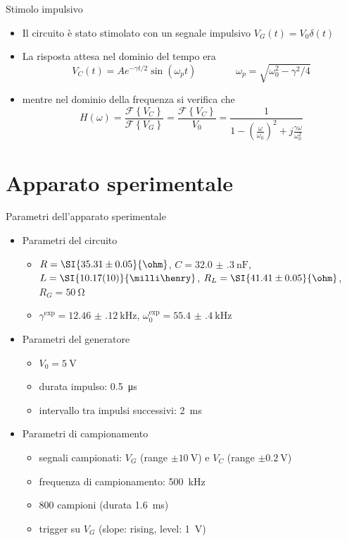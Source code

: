 \documentclass[11pt, xcolor=dvipsnames, aspectratio=43]{beamer}
\newcommand{\fourier}[1]{\mathcal{F}\left\{#1\right\}}
\begin{document}
\begin{frame}{Stimolo impulsivo}
\begin{itemize}
\item<1->{
Il circuito è stato stimolato con un segnale impulsivo $V_G(t) = V_0 \delta(t)$
}

\item<2->{
La risposta attesa nel dominio del \alert{tempo} era
\[
V_C(t) = Ae^{- \gamma t / 2}\sin{(\omega_p t)} \qquad \qquad \omega_p = \sqrt{\omega_0^2 - \gamma^2 / 4}
\]
}
\item<3->{
mentre nel dominio della \alert{frequenza} si verifica che
\[
H(\omega) = \frac{\fourier{V_C}}{\fourier{V_G}} = \frac{\fourier{V_C}}{V_0} =  \frac{1}{1 - \left(\frac{\omega}{\omega_0}\right)^2 + j \frac{\gamma \omega}{\omega_0^2}}
\]
}

\end{itemize}
\end{frame}

\section{Apparato sperimentale}
\begin{frame}{Parametri dell'apparato sperimentale}
\begin{itemize}
\item<1-> Parametri del circuito
\begin{itemize}
\item<1-> {$R = \SI{35.31 \pm 0.05}{\ohm}$, $C=\SI{32.0(3)}{\nano\farad}$, $L= \SI{10.17 (10)}{\milli\henry}$, $R_L = \SI{41.41 \pm 0.05}{\ohm}$, $R_G = \SI{50}{\ohm}$}
\item<1-> $\gamma^\text{exp} = \SI{12.46(12)}{\kilo\hertz}$, $\omega_0^\text{exp} = \SI{55.4(4)}{\kilo\hertz}$
\end{itemize}

\item<2-> Parametri del generatore
\begin{itemize}
\item<2-> $V_0 = \SI{5}{\volt}$
\item<2-> durata impulso: \SI{0.5}{\micro\second}
\item<2-> intervallo tra impulsi successivi: \SI{2}{\milli\second} 
\end{itemize}

\item<3-> Parametri di campionamento
\begin{itemize}
\item<3-> segnali campionati: $V_G$ (range $\pm\SI{10}{\volt}$) e $V_C$ (range $\pm\SI{0.2}{\volt}$)
\item<3-> frequenza di campionamento: \SI{500}{\kilo\hertz}
\item<3-> 800 campioni (durata \SI{1.6}{\milli\second})
\item<3-> trigger su $V_G$ (slope: rising, level: \SI{1}{\volt})
\end{itemize}
\end{itemize}

\end{frame}
\end{document}
